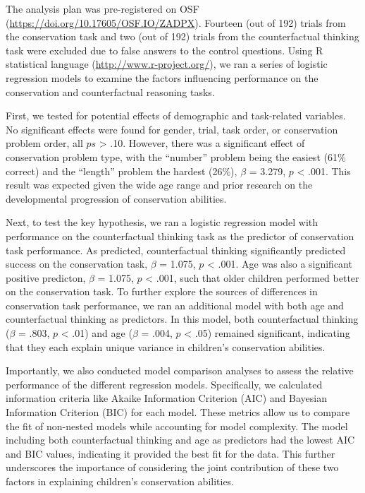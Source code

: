 \documentclass[
  doc]{apa6}
\begin{document}
The analysis plan was pre-registered on OSF (\url{https://doi.org/10.17605/OSF.IO/ZADPX}). Fourteen (out of 192) trials from the conservation task and two (out of 192) trials from the counterfactual thinking task were excluded due to false answers to the control questions.
Using R statistical language (\url{http://www.r-project.org/}), we ran a series of logistic regression models to examine the factors influencing performance on the conservation and counterfactual reasoning tasks.

First, we tested for potential effects of demographic and task-related variables. No significant effects were found for gender, trial, task order, or conservation problem order, all \(ps\) \textgreater{} .10. However, there was a significant effect of conservation problem type, with the ``number'' problem being the easiest (61\% correct) and the ``length'' problem the hardest (26\%), \(\beta\) = 3.279, \(p\) \textless{} .001. This result was expected given the wide age range and prior research on the developmental progression of conservation abilities.

Next, to test the key hypothesis, we ran a logistic regression model with performance on the counterfactual thinking task as the predictor of conservation task performance.
As predicted, counterfactual thinking significantly predicted success on the conservation task, \(\beta\) = 1.075, \(p\) \textless{} .001. Age was also a significant positive predicton, \(\beta\) = 1.075, \(p\) \textless{} .001, such that older children performed better on the conservation task.
To further explore the sources of differences in conservation task performance, we ran an additional model with both age and counterfactual thinking as predictors. In this model, both counterfactual thinking (\(\beta\) = .803, \(p\) \textless{} .01) and age (\(\beta\) = .004, \(p\) \textless{} .05) remained significant, indicating that they each explain unique variance in children's conservation abilities.

Importantly, we also conducted model comparison analyses to assess the relative performance of the different regression models. Specifically, we calculated information criteria like Akaike Information Criterion (AIC) and Bayesian Information Criterion (BIC) for each model. These metrics allow us to compare the fit of non-nested models while accounting for model complexity. The model including both counterfactual thinking and age as predictors had the lowest AIC and BIC values, indicating it provided the best fit for the data. This further underscores the importance of considering the joint contribution of these two factors in explaining children's conservation abilities.
\end{document}
